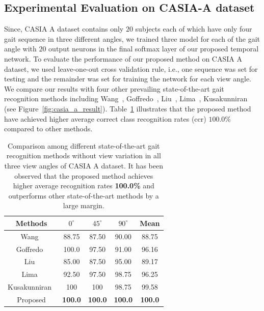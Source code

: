 \subsection{Experimental Evaluation on CASIA-A dataset}
Since, CASIA A dataset contains only $ 20 $ subjects each of which have only four gait sequence in three different angles, we trained three model for each of the gait angle with $ 20 $ output neurons in the final softmax layer of our proposed temporal network. To evaluate the performance of our proposed method on CASIA A dataset, we used leave-one-out cross validation rule, i.e., one sequence was set for testing and the remainder was set for training the network for each view angle. We compare our results with four other prevailing state-of-the-art gait recognition methods including Wang~\cite{Wang_03}, Goffredo~\cite{Goffredo_08}, Liu~\cite{Liu_16}, Lima~\cite{Lima_19}, Kusakunniran~\cite{Kusakunniran_09} (see Figure~\ref{fig:casia_a_result}). Table~\ref{table:casia_a_result} illustrates that the proposed method have achieved higher average correct class recognition rates (\gls{ccr}) $100.0\%$ compared to other methods.


\begin{table}
	\centering
	\caption [Comparison among different state-of-the-art gait recognition methods without view variation in all three view angles of CASIA A dataset]
	{Comparison among different state-of-the-art gait recognition methods without view variation in all three view angles of CASIA A dataset. It has been observed that the proposed method achieves higher average recognition rates \textbf{100.0\%} and outperforms other state-of-the-art methods by a large margin. \label{table:casia_a_result}}
	{\begin{tabular*}{30pc}{@{\extracolsep{\fill}}ccccc}\hline
			
			Methods &${0^{\circ}}$ &${45^{\circ}}$   &${90^{\circ}}$  &Mean\\
			\hline
			
			Wang~\cite{Wang_03} &88.75 &87.50 &90.00 &88.75\\
			
			\noalign{\smallskip}
			Goffredo~\cite{Goffredo_08} &100.0 &97.50 &91.00 &96.16\\ 
			
			\noalign{\smallskip}
			Liu~\cite{Liu_16} &85.00 &87.50 &95.00 &89.17\\ 
			
			\noalign{\smallskip}
			Lima~\cite{Lima_19} &92.50 &97.50 &98.75 &96.25 \\
			
			\noalign{\smallskip}
			Kusakunniran~\cite{Kusakunniran_09} &100  &100  &98.75 &99.58 \\
			
			\noalign{\smallskip}
			Proposed &{\textbf{100.0}} & {\textbf{100.0}} &{\textbf{100.0}} & {\textbf{100.0}}\\
			\hline
	\end{tabular*}}{}
\end{table}

